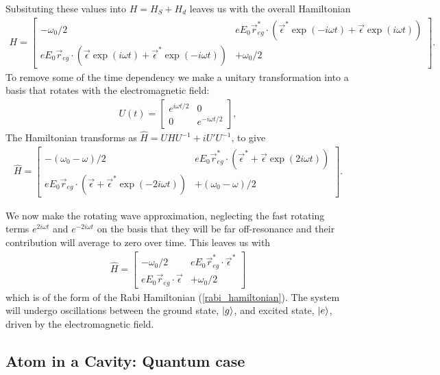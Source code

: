 Subsituting these values into $H = H_S + H_d$ leaves us with the overall Hamiltonian
\begin{align}
  H =
  \begin{bmatrix}
    -\omega_0/2 & eE_0\vec{r}_{eg}^*\cdot(\vec{\epsilon}^*\exp(-i\omega t) + \vec{\epsilon}\exp(i\omega t)) \\
    eE_0\vec{r}_{eg}\cdot(\vec{\epsilon}\exp(i\omega t) + \vec{\epsilon}^*\exp(-i\omega t)) & +\omega_0/2
  \end{bmatrix}.
\end{align}
To remove some of the time dependency we make a unitary transformation into a basis that rotates with the electromagnetic field:
\begin{align}
  U(t) =
  \begin{bmatrix}
    e^{i\omega t/2} & 0 \\
    0 & e^{-i\omega t/2}
  \end{bmatrix},
\end{align}
The Hamiltonian transforms as $\hat{H} = UHU^{-1} + i U'U^{-1}$, to give
\begin{align}
  \hat{H} =
  \begin{bmatrix}
    -(\omega_0-\omega)/2 & eE_0\vec{r}_{eg}^*\cdot(\vec{\epsilon}^* + \vec{\epsilon}\exp(2i\omega t)) \\
    eE_0\vec{r}_{eg}\cdot(\vec{\epsilon} + \vec{\epsilon}^*\exp(-2i\omega t)) & +(\omega_0-\omega)/2
  \end{bmatrix}.
\end{align}

We now make the rotating wave approximation, neglecting the fast rotating terms $e^{2i\omega t}$ and $e^{-2i\omega t}$ on the basis that they will be far off-resonance and their contribution will average to zero over time. This leaves us with 
\begin{align}
  \hat{H} =
  \begin{bmatrix}
    -\omega_0/2 & eE_0\vec{r}_{eg}^*\cdot\vec{\epsilon}^* \\
    eE_0\vec{r}_{eg}\cdot\vec{\epsilon} & +\omega_0/2
  \end{bmatrix}
\end{align}
which is of the form of the Rabi Hamiltonian (\ref{rabi_hamiltonian}). The system will undergo oscillations between the ground state, $\left\vert g\right\rangle$, and excited state, $\left\vert e\right\rangle$, driven by the electromagnetic field.

\subsection{Atom in a Cavity: Quantum case}\label{JC_Ham}

